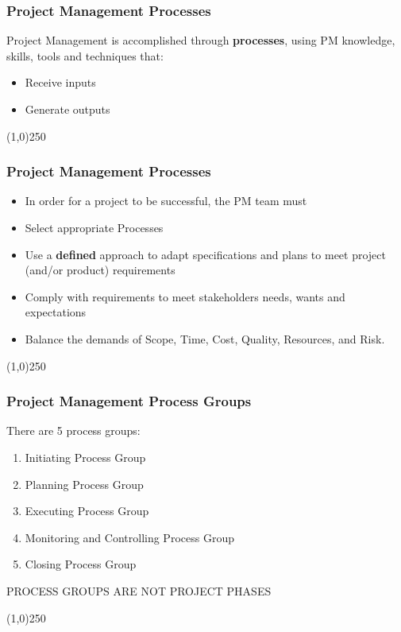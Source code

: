 \begin{frame}
\frametitle{Project Management Processes}
Project Management is accomplished through \textbf{processes}, using PM knowledge, skills, tools and techniques that:\\
\begin{itemize}
	\item Receive inputs
	\item Generate outputs
\end{itemize}
\end{frame}
\begin{center}\line(1,0){250}\end{center}



\begin{frame}
\frametitle{Project Management Processes}
\begin{itemize}
	\item In order for a project to be successful, the PM team must\\
	\item Select appropriate Processes
	\item Use a \textbf{defined} approach to adapt specifications and plans to meet project (and/or product) requirements
	\item Comply with requirements to meet stakeholders needs, wants and expectations
	\item Balance the demands of Scope, Time, Cost, Quality, Resources, and Risk.
\end{itemize}
\end{frame}
\begin{center}\line(1,0){250}\end{center}



\begin{frame}
\frametitle{Project Management Process Groups}
There are 5 process groups:
\begin{enumerate}
	\item Initiating Process Group
	\item Planning Process Group
	\item Executing Process Group
	\item Monitoring and Controlling Process Group
	\item Closing Process Group
\end{enumerate}
PROCESS GROUPS ARE NOT PROJECT PHASES\\
\end{frame}
\begin{center}\line(1,0){250}\end{center}



